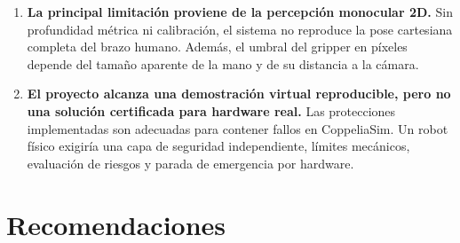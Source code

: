 \begin{enumerate}
    \item \textbf{La principal limitación proviene de la percepción monocular
    2D.} Sin profundidad métrica ni calibración, el sistema no reproduce la
    pose cartesiana completa del brazo humano. Además, el umbral del gripper en
    píxeles depende del tamaño aparente de la mano y de su distancia a la
    cámara.

    \item \textbf{El proyecto alcanza una demostración virtual reproducible,
    pero no una solución certificada para hardware real.} Las protecciones
    implementadas son adecuadas para contener fallos en CoppeliaSim. Un robot
    físico exigiría una capa de seguridad independiente, límites mecánicos,
    evaluación de riesgos y parada de emergencia por hardware.
\end{enumerate}

\section{Recomendaciones}
\label{sec:recomendaciones}

